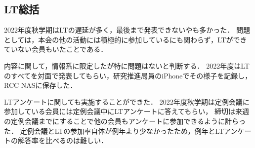 \subsection*{LT総括}



2022年度秋学期はLTの遅延が多く，最後まで発表できない\firstGrade{}や\secondGrade{}も多かった．
問題としては，本会の他の活動には積極的に参加しているにも関わらず，LTができていない会員もいたことである．

内容に関して，情報系に限定したが特に問題はないと判断する．
2022年度はLTのすべてを対面で発表してもらい，研究推進局員のiPhoneでその様子を記録し，RCC NASに保存した．


LTアンケートに関しても実施することができた．
2022年度秋学期は定例会議に参加している会員には定例会議中にLTアンケートに答えてもらい，
締切は来週の定例会議までにすることで他の会員もアンケートに参加できるように計らった．
定例会議とLTの参加率自体が例年より少なかったため，例年とLTアンケートの解答率を比べるのは難しい．
